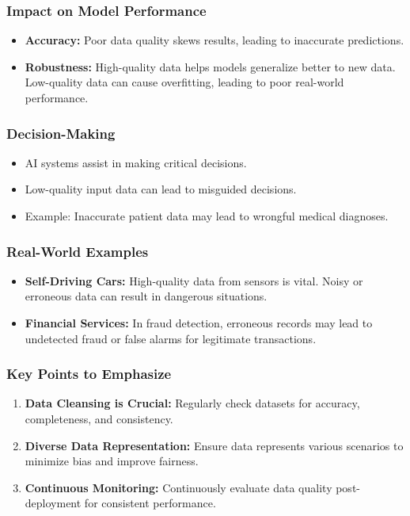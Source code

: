 \documentclass[aspectratio=169]{beamer}
\begin{document}
\begin{frame}[fragile]
    \frametitle{Impact on Model Performance}
    \begin{itemize}
        \item \textbf{Accuracy:} Poor data quality skews results, leading to inaccurate predictions.
        \item \textbf{Robustness:} High-quality data helps models generalize better to new data. Low-quality data can cause overfitting, leading to poor real-world performance.
    \end{itemize}
\end{frame}

\begin{frame}[fragile]
    \frametitle{Decision-Making}
    \begin{itemize}
        \item AI systems assist in making critical decisions. 
        \item Low-quality input data can lead to misguided decisions.
        \item Example: Inaccurate patient data may lead to wrongful medical diagnoses.
    \end{itemize}
\end{frame}

\begin{frame}[fragile]
    \frametitle{Real-World Examples}
    \begin{itemize}
        \item \textbf{Self-Driving Cars:} High-quality data from sensors is vital. Noisy or erroneous data can result in dangerous situations.
        \item \textbf{Financial Services:} In fraud detection, erroneous records may lead to undetected fraud or false alarms for legitimate transactions.
    \end{itemize}
\end{frame}

\begin{frame}[fragile]
    \frametitle{Key Points to Emphasize}
    \begin{enumerate}
        \item \textbf{Data Cleansing is Crucial:} Regularly check datasets for accuracy, completeness, and consistency.
        \item \textbf{Diverse Data Representation:} Ensure data represents various scenarios to minimize bias and improve fairness.
        \item \textbf{Continuous Monitoring:} Continuously evaluate data quality post-deployment for consistent performance.
    \end{enumerate}
\end{frame}
\end{document}
